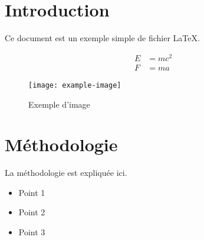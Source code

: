\documentclass{article}
\begin{document}
    
    \section{Introduction}
    Ce document est un exemple simple de fichier LaTeX.
    
    \begin{align*}
        E &= mc^2 \\
        F &= ma
    \end{align*}
    
    \begin{figure}[h]
        \centering
        \texttt{[image: example-image]}
        \caption{Exemple d'image}
    \end{figure}
    
    \section{Méthodologie}
    La méthodologie est expliquée ici.
    
    \begin{itemize}
        \item Point 1
        \item Point 2
        \item Point 3\\
    \end{itemize}
    
\end{document}
